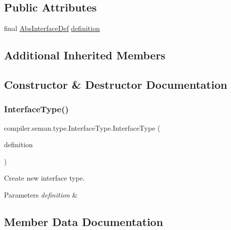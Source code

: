 \subsection*{Public Attributes}
\begin{DoxyCompactItemize}
\item 
final \hyperlink{classcompiler_1_1abstr_1_1tree_1_1def_1_1_abs_interface_def}{Abs\+Interface\+Def} \hyperlink{classcompiler_1_1seman_1_1type_1_1_interface_type_ac3156453724ae8b59bd21521b90c3a91}{definition}
\end{DoxyCompactItemize}
\subsection*{Additional Inherited Members}


\subsection{Constructor \& Destructor Documentation}
\mbox{\label{classcompiler_1_1seman_1_1type_1_1_interface_type_aa0683b06249a8fe7974c3601b504ad98}} 
\subsubsection{\texorpdfstring{Interface\+Type()}{InterfaceType()}}
{\footnotesize\ttfamily compiler.\+seman.\+type.\+Interface\+Type.\+Interface\+Type (\begin{DoxyParamCaption}\item[{\hyperlink{classcompiler_1_1abstr_1_1tree_1_1def_1_1_abs_interface_def}{Abs\+Interface\+Def}}]{definition }\end{DoxyParamCaption})}

Create new interface type. 
\begin{DoxyParams}{Parameters}
{\em definition} & \\
\hline
\end{DoxyParams}


\subsection{Member Data Documentation}
\mbox{\label{classcompiler_1_1seman_1_1type_1_1_interface_type_ac3156453724ae8b59bd21521b90c3a91}} 

